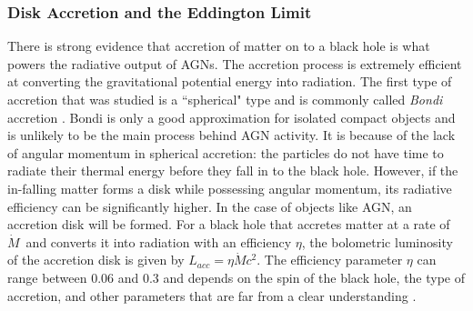 \subsubsection{Disk Accretion and the Eddington Limit\label{subsec:accretion}}
There is strong evidence that accretion of matter on to a black hole is what powers the radiative output of AGNs. The accretion process is extremely efficient at converting the gravitational potential energy into radiation. The first type of accretion that was studied is a ``spherical" type and is commonly called \textit{Bondi} accretion \citep{bondi1952spherically}. Bondi is only a good approximation for isolated compact objects and is unlikely to be the main process behind AGN activity. It is because of the lack of angular momentum in spherical accretion: the particles do not have time to radiate their thermal energy before they fall in to the black hole. However, if the in-falling matter forms a disk while possessing angular momentum, its radiative efficiency can be significantly higher. In the case of objects like AGN, an accretion disk will be formed. For a black hole that accretes matter at a rate of $\dot{M}$~and converts it into radiation with an efficiency $\eta$, the bolometric luminosity of the accretion disk is given by $L_{acc}=\eta\dot{M}c^2$. The efficiency parameter $\eta$ can range between 0.06 and 0.3 and depends on the spin of the black hole, the type of accretion, and other parameters that are far from a clear understanding \citep{raimundo2009eddington}.

